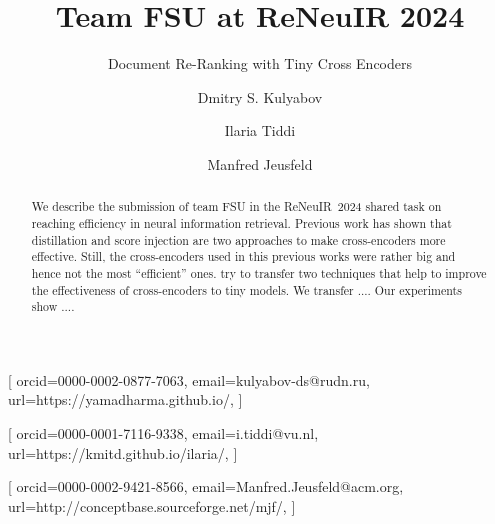 \title{Team FSU at ReNeuIR 2024}
\subtitle{Document Re-Ranking with Tiny Cross Encoders}





\tnotemark[1]

\author[1,2]{Dmitry S. Kulyabov}[%
orcid=0000-0002-0877-7063,
email=kulyabov-ds@rudn.ru,
url=https://yamadharma.github.io/,
]
\cormark[1]
\fnmark[1]
\address[1]{Peoples' Friendship University of Russia (RUDN University),
  6 Miklukho-Maklaya St, Moscow, 117198, Russian Federation}
\address[2]{Joint Institute for Nuclear Research,
  6 Joliot-Curie, Dubna, Moscow region, 141980, Russian Federation}

\author[3]{Ilaria Tiddi}[%
orcid=0000-0001-7116-9338,
email=i.tiddi@vu.nl,
url=https://kmitd.github.io/ilaria/,
]
\fnmark[1]
\address[3]{Vrije Universiteit Amsterdam, De Boelelaan 1105, 1081 HV Amsterdam, The Netherlands}

\author[4]{Manfred Jeusfeld}[%
orcid=0000-0002-9421-8566,
email=Manfred.Jeusfeld@acm.org,
url=http://conceptbase.sourceforge.net/mjf/,
]
\fnmark[1]
\address[4]{University of Skövde, Högskolevägen 1, 541 28 Skövde, Sweden}


\begin{abstract}
%
%
%
  We describe the submission of team FSU in the ReNeuIR~2024 shared task on reaching efficiency in neural information retrieval. Previous work has shown that distillation and score injection are two approaches to make cross-encoders more effective. Still, the cross-encoders used in this previous works were rather big and hence not the most ``efficient'' ones. try to transfer two techniques that help to improve the effectiveness of cross-encoders to tiny models. We transfer {\color{red} ...}. Our experiments show {\color{red}...}.
%
\end{abstract}

